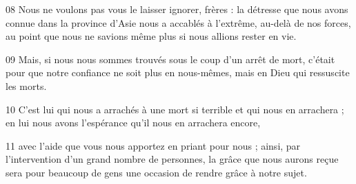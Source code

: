
08 Nous ne voulons pas vous le laisser ignorer, frères : la détresse que nous avons connue dans la province d’Asie nous a accablés à l’extrême, au-delà de nos forces, au point que nous ne savions même plus si nous allions rester en vie.

09 Mais, si nous nous sommes trouvés sous le coup d’un arrêt de mort, c’était pour que notre confiance ne soit plus en nous-mêmes, mais en Dieu qui ressuscite les morts.

10 C’est lui qui nous a arrachés à une mort si terrible et qui nous en arrachera ; en lui nous avons l’espérance qu’il nous en arrachera encore,

11 avec l’aide que vous nous apportez en priant pour nous ; ainsi, par l’intervention d’un grand nombre de personnes, la grâce que nous aurons reçue sera pour beaucoup de gens une occasion de rendre grâce à notre sujet.